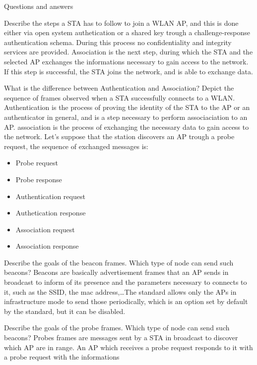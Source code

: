 \begin{section}{Questions and answers}
\begin{subsubsection}{Describe the steps a STA has to follow to join a WLAN}
    AP, and this is done either via open system authetication or a shared key trough a
    challenge-response authentication schema. During this process no confidentiality and integrity
    services are provided. Association is the next step, during which the STA and the selected AP
    exchanges the informations necessary to gain access to the network. If this step is successful,
    the STA joins the network, and is able to exchange data.
  \end{subsubsection}
  \begin{subsubsection}{What is the difference between Authentication and
      Association? Depict the sequence of frames observed when a STA
    successfully connects to a WLAN.}
    Authentication is the process of proving the identity of the STA to the AP or an authenticator
    in general, and is a step necessary to perform associaciation to an AP. association is the
    process of exchanging the necessary data to gain access to the network.
    Let's suppose that the station discovers an AP trough a probe request, the sequence of exchanged
    messages is: 
    \begin{itemize}
      \item Probe request 
      \item Probe response 
      \item Authentication request 
      \item Authetication response 
      \item Association request 
      \item Association response 
    \end{itemize}
  \end{subsubsection}
  \begin{subsubsection}{Describe the goals of the beacon frames. Which type of
    node can send such beacons?}
    Beacons are basically advertisement frames that an AP sends in broadcast to inform of its
    presence and the parameters necessary to connects to it, such as the SSID, the mac
    address,\dots The standard allows only the APs in infrastructure mode to send those
    periodically, which is an option set by default by the standard, but it can be disabled.
  \end{subsubsection}
  \begin{subsubsection}{Describe the goals of the probe frames. Which type of
    node can send such beacons?}
    Probes frames are messages sent by a STA in broadcast to discover which AP are in range. An AP
    which receives a probe request responds to it with a probe request with the informations

\end{subsubsection}
\end{section}
